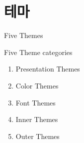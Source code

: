 \documentclass[9pt,blue,xcolor=pdftex,dvipsnames,table,handout,notes]{beamer}
\begin{document}
		\section{테마}

		\begin{frame}[plain]
		\centering
		\end{frame}



		\begin{frame}[t]{Five Themes}

			\begin{block} {Five Theme categories}
			\begin{enumerate}
			\item Presentation Themes
			\item Color Themes
			\item Font Themes
			\item Inner Themes
			\item Outer Themes
			\end{enumerate}
			\end{block}

		\end{frame}
\end{document}
